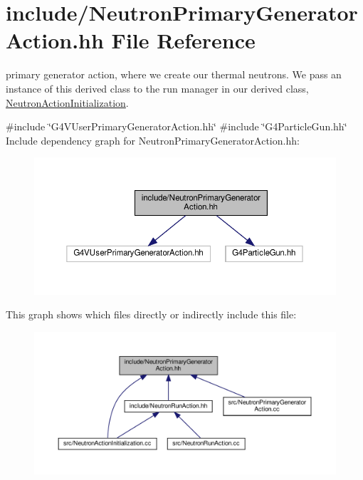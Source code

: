 \hypertarget{NeutronPrimaryGeneratorAction_8hh}{}\section{include/\+Neutron\+Primary\+Generator\+Action.hh File Reference}
\label{NeutronPrimaryGeneratorAction_8hh}


primary generator action, where we create our thermal neutrons. We pass an instance of this derived class to the run manager in our derived class, \hyperlink{classNeutronActionInitialization}{Neutron\+Action\+Initialization}.  


{\ttfamily \#include \char`\"{}G4\+V\+User\+Primary\+Generator\+Action.\+hh\char`\"{}}\newline
{\ttfamily \#include \char`\"{}G4\+Particle\+Gun.\+hh\char`\"{}}\newline
Include dependency graph for Neutron\+Primary\+Generator\+Action.\+hh\+:
\nopagebreak
\begin{figure}[H]
\begin{center}
\leavevmode
\includegraphics[width=350pt]{NeutronPrimaryGeneratorAction_8hh__incl}
\end{center}
\end{figure}
This graph shows which files directly or indirectly include this file\+:
\nopagebreak
\begin{figure}[H]
\begin{center}
\leavevmode
\includegraphics[width=350pt]{NeutronPrimaryGeneratorAction_8hh__dep__incl}
\end{center}
\end{figure}
